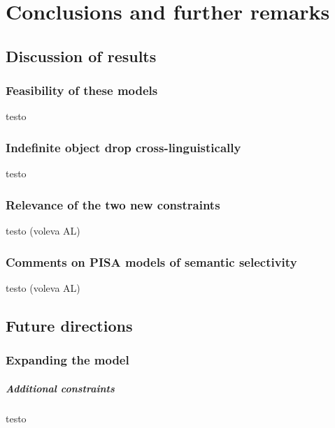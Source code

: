 \setchapterpreamble[u]{\margintoc}
\chapter{Conclusions and further remarks}


\section{Discussion of results} 

\subsection{Feasibility of these models}

testo

\subsection{Indefinite object drop cross-linguistically}

testo

\subsection{Relevance of the two new constraints}

testo (voleva AL)

\subsection{Comments on PISA models of semantic selectivity}

testo (voleva AL)


\section{Future directions} 


\subsection{Expanding the model}


\paragraph{Additional constraints}
testo



